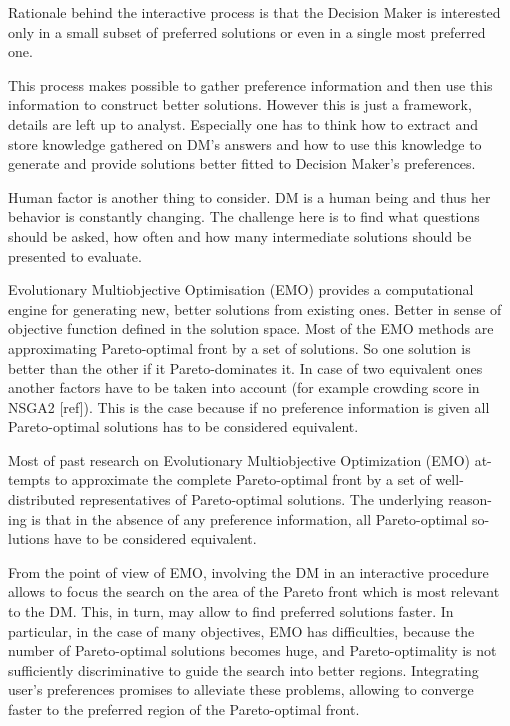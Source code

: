 Rationale behind the interactive process is that the Decision Maker is
interested only in a small subset of preferred solutions or even in a single
most preferred one.

This process makes possible to gather preference information and then use this
information to construct better solutions. However this is just a framework,
details are left up to analyst. Especially one has to think how to extract and
store knowledge gathered on DM's answers and how to use this knowledge to
generate and provide solutions better fitted to Decision Maker's
preferences.

Human factor is another thing to consider. DM is a human being and thus her
behavior is constantly changing. The challenge here is to find what questions
should be asked, how often and how many intermediate solutions should be
presented to evaluate. 

Evolutionary Multiobjective Optimisation (EMO) provides a computational engine
for generating new, better solutions from existing ones. Better in sense of
objective function defined in the solution space. Most of the EMO methods are
approximating Pareto-optimal front by a set of solutions. So one solution is
better than the other if it Pareto-dominates it. In case of two equivalent
ones another factors have to be taken into account (for example crowding score
in NSGA2 [ref]). This is the case because if no preference information is
given all Pareto-optimal solutions has to be considered equivalent.



Most of past research on Evolutionary Multiobjective Optimization (EMO) at-
tempts to approximate the complete Pareto-optimal front by a set of well-
distributed representatives of Pareto-optimal solutions. The underlying reason-
ing is that in the absence of any preference information, all Pareto-optimal so-
lutions have to be considered equivalent.


From the point of view of EMO, involving the DM in an interactive procedure
allows to focus the search on the area of the Pareto front which is most
relevant to the DM. This, in turn, may allow to find preferred solutions
faster. In particular, in the case of many objectives, EMO has difficulties,
because the number of Pareto-optimal solutions becomes huge, and
Pareto-optimality is not sufficiently discriminative to guide the search into
better regions. Integrating user’s preferences promises to alleviate these
problems, allowing to converge faster to the preferred region of the
Pareto-optimal front.
